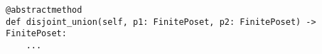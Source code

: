 \begin{verbatim}
@abstractmethod
def disjoint_union(self, p1: FinitePoset, p2: FinitePoset) -> FinitePoset:
    ...
\end{verbatim}